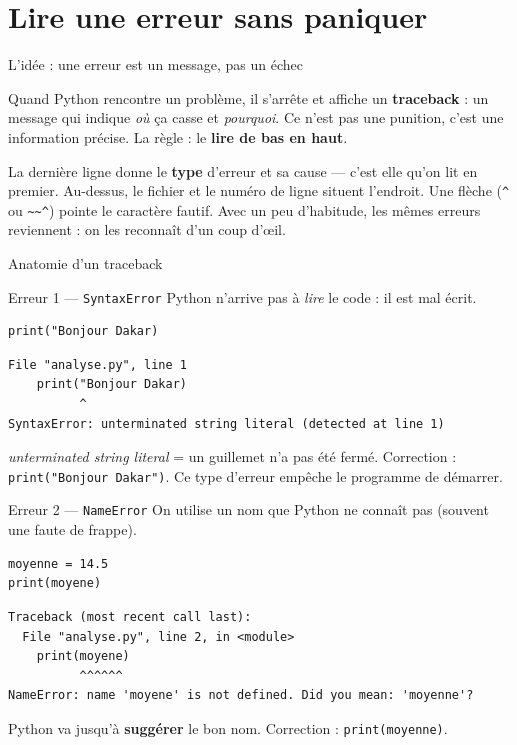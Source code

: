 \documentclass[aspectratio=169,11pt]{beamer}
\begin{document}
\section{Lire une erreur sans paniquer}

\begin{frame}{L'idée : une erreur est un message, pas un échec}
\begin{ucaddef}
{\small Quand Python rencontre un problème, il s'arrête et affiche un \textbf{traceback} : un message qui indique \emph{où} ça casse et \emph{pourquoi}. Ce n'est pas une punition, c'est une information précise. La règle : le \textbf{lire de bas en haut}.}
\end{ucaddef}
{\small La dernière ligne donne le \textbf{type} d'erreur et sa cause — c'est elle qu'on lit en premier. Au-dessus, le fichier et le numéro de ligne situent l'endroit. Une flèche (\texttt{\^{}} ou \texttt{\~{}\~{}\^{}}) pointe le caractère fautif. Avec un peu d'habitude, les mêmes erreurs reviennent : on les reconnaît d'un coup d'œil.}
\end{frame}

\begin{frame}{Anatomie d'un traceback}
\end{frame}

\begin{frame}[fragile]{Erreur 1 — \texttt{SyntaxError}}
{\small Python n'arrive pas à \emph{lire} le code : il est mal écrit.}
\begin{lstlisting}
print("Bonjour Dakar)
\end{lstlisting}
\begin{lstlisting}[style=err]
  File "analyse.py", line 1
    print("Bonjour Dakar)
          ^
SyntaxError: unterminated string literal (detected at line 1)
\end{lstlisting}
{\small \emph{unterminated string literal} = un guillemet n'a pas été fermé. Correction : \texttt{print("Bonjour Dakar")}. Ce type d'erreur empêche le programme de démarrer.}
\end{frame}

\begin{frame}[fragile]{Erreur 2 — \texttt{NameError}}
{\small On utilise un nom que Python ne connaît pas (souvent une faute de frappe).}
\begin{lstlisting}
moyenne = 14.5
print(moyene)
\end{lstlisting}
\begin{lstlisting}[style=err]
Traceback (most recent call last):
  File "analyse.py", line 2, in <module>
    print(moyene)
          ^^^^^^
NameError: name 'moyene' is not defined. Did you mean: 'moyenne'?
\end{lstlisting}
{\small Python va jusqu'à \textbf{suggérer} le bon nom. Correction : \texttt{print(moyenne)}.}
\end{frame}
\end{document}
